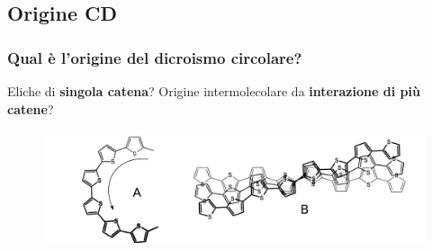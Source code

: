 \documentclass{beamer}
\begin{document}
\subsection{Origine CD}
\begin{frame}%
\frametitle{Qual è l'origine del dicroismo circolare?}
Eliche di \textbf{singola catena}?
\vfill
Origine intermolecolare da \textbf{interazione di più catene}?
\vfill
\begin{figure}\centering\includegraphics[width=1\textwidth]{img/conformazioni2.png}\end{figure}
\end{frame}
\end{document}
